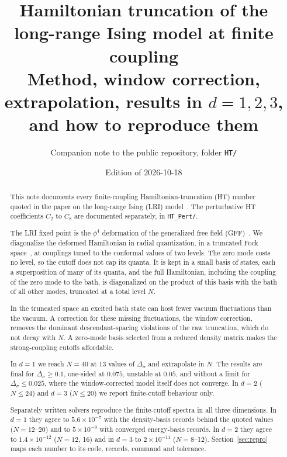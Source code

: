 \documentclass[11pt]{article}
\title{Hamiltonian truncation of the long-range Ising model at finite coupling\\[2pt]
\large Method, window correction, extrapolation, results in $d=1,2,3$, and how to reproduce them}
\author{Companion note to the public repository, folder \texttt{HT/}}
\date{Edition of 2026-10-18}
\newcommand{\Ds}{\Delta_\sigma}
\begin{document}
\maketitle

\begin{abstract}
This note documents every finite-coupling Hamiltonian-truncation (HT) number quoted in the paper on the long-range
Ising (LRI) model~\cite{paper}. The perturbative HT coefficients $C_2$ to $C_8$ are documented separately, in
\texttt{HT\_Pert/}.

The LRI fixed point is the $\phi^4$ deformation of the generalized free field (GFF)~\cite{Fisher:1972zz,Sak:1973oqx,Paulos:2015jfa}.
We diagonalize the deformed Hamiltonian in radial quantization, in a truncated Fock space~\cite{Hogervorst:2014rta,Rychkov:2014eea},
at couplings tuned to the conformal values of two levels. The zero mode costs no level, so the cutoff does not cap
its quanta. It is kept in a small basis of states, each a superposition of many of its quanta, and the full
Hamiltonian, including the coupling of the zero mode to the bath, is diagonalized on the product of this basis with
the bath of all other modes, truncated at a total level $N$.

In the truncated space an excited bath state can host fewer vacuum fluctuations than the vacuum. A correction for
these missing fluctuations, the window correction, removes the dominant descendant-spacing violations of the raw
truncation, which do not decay with $N$. A zero-mode basis selected from a reduced density matrix makes the
strong-coupling cutoffs affordable.

In $d=1$ we reach $N=40$ at 13 values of $\Ds$ and extrapolate in $N$. The results are final for
$\Ds\geq0.1$, one-sided at $0.075$, unstable at $0.05$, and without a limit for $\Ds\leq0.025$, where the
window-corrected model itself does not converge. In $d=2$ ($N\leq24$) and $d=3$ ($N\leq20$) we report
finite-cutoff behaviour only.

Separately written solvers reproduce the finite-cutoff spectra in all three dimensions. In $d=1$ they agree to
$5.6\times10^{-7}$ with the density-basis records behind the quoted values ($N=12$--20) and to $5\times10^{-9}$ with
converged energy-basis records. In $d=2$ they agree to $1.4\times10^{-12}$ ($N=12$, 16) and in $d=3$ to
$2\times10^{-11}$ ($N=8$--12). Section~\ref{sec:repro} maps each number to its code, records, command and tolerance.
\end{abstract}

\tableofcontents
\end{document}
